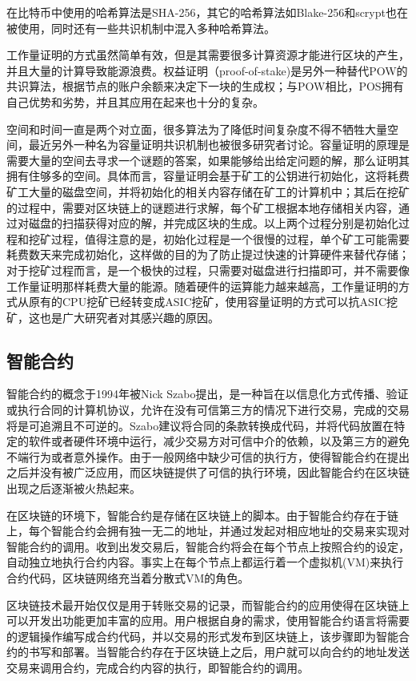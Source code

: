 在比特币中使用的哈希算法是SHA-256，其它的哈希算法如Blake-256和scrypt也在被使用，同时还有一些共识机制中混入多种哈希算法。

工作量证明的方式虽然简单有效，但是其需要很多计算资源才能进行区块的产生，并且大量的计算导致能源浪费。权益证明（proof-of-stake)\supercite{vasin2014blackcoin}是另外一种替代POW的共识算法，根据节点的账户余额来决定下一块的生成权；与POW相比，POS拥有自己优势和劣势，并且其应用在起来也十分的复杂。

空间和时间一直是两个对立面，很多算法为了降低时间复杂度不得不牺牲大量空间，最近另外一种名为容量证明共识机制也被很多研究者讨论。容量证明\supercite{ateniese2014proofs}的原理是需要大量的空间去寻求一个谜题的答案，如果能够给出给定问题的解，那么证明其拥有住够多的空间。具体而言，容量证明会基于矿工的公钥进行初始化，这将耗费矿工大量的磁盘空间，并将初始化的相关内容存储在矿工的计算机中；其后在挖矿的过程中，需要对区块链上的谜题进行求解，每个矿工根据本地存储相关内容，通过对磁盘的扫描获得对应的解，并完成区块的生成。以上两个过程分别是初始化过程和挖矿过程，值得注意的是，初始化过程是一个很慢的过程，单个矿工可能需要耗费数天来完成初始化，这样做的目的为了防止提过快速的计算硬件来替代存储；对于挖矿过程而言，是一个极快的过程，只需要对磁盘进行扫描即可，并不需要像工作量证明那样耗费大量的能源。随着硬件的运算能力越来越高，工作量证明的方式从原有的CPU挖矿已经转变成ASIC挖矿，使用容量证明的方式可以抗ASIC挖矿，这也是广大研究者对其感兴趣的原因。


\subsection{智能合约}

智能合约的概念于1994年被Nick Szabo提出\supercite{szabo1996smart}，是一种旨在以信息化方式传播、验证或执行合同的计算机协议，允许在没有可信第三方的情况下进行交易，完成的交易将是可追溯且不可逆的。Szabo建议将合同的条款转换成代码，并将代码放置在特定的软件或者硬件环境中运行，减少交易方对可信中介的依赖，以及第三方的避免不端行为或者意外操作。由于一般网络中缺少可信的执行方，使得智能合约在提出之后并没有被广泛应用，而区块链提供了可信的执行环境，因此智能合约在区块链出现之后逐渐被火热起来。

在区块链的环境下，智能合约是存储在区块链上的脚本。由于智能合约存在于链上，每个智能合约会拥有独一无二的地址，并通过发起对相应地址的交易来实现对智能合约的调用。收到出发交易后，智能合约将会在每个节点上按照合约的设定，自动独立地执行合约内容。事实上在每个节点上都运行着一个虚拟机(VM)来执行合约代码，区块链网络充当着分散式VM的角色。

区块链技术最开始仅仅是用于转账交易的记录，而智能合约的应用使得在区块链上可以开发出功能更加丰富的应用。用户根据自身的需求，使用智能合约语言将需要的逻辑操作编写成合约代码，并以交易的形式发布到区块链上，该步骤即为智能合约的书写和部署。当智能合约存在于区块链上之后，用户就可以向合约的地址发送交易来调用合约，完成合约内容的执行，即智能合约的调用。


